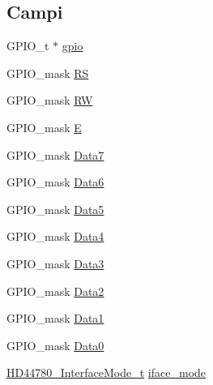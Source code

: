 \subsection*{Campi}
\begin{DoxyCompactItemize}
\item 
G\+P\+I\+O\+\_\+t $\ast$ \hyperlink{struct_h_d44780___l_c_d__t_acb3116190992a4d8d26545c103304d27}{gpio}
\item 
G\+P\+I\+O\+\_\+mask \hyperlink{struct_h_d44780___l_c_d__t_a142ae0db638dca7ab42e2183a1311d32}{R\+S}
\item 
G\+P\+I\+O\+\_\+mask \hyperlink{struct_h_d44780___l_c_d__t_af8225e4a125a2159215dfa03372c305f}{R\+W}
\item 
G\+P\+I\+O\+\_\+mask \hyperlink{struct_h_d44780___l_c_d__t_a851ed1cefdadae2e5069d1364ae8fc9e}{E}
\item 
G\+P\+I\+O\+\_\+mask \hyperlink{struct_h_d44780___l_c_d__t_a7f1bd9ea66e1fa6d0667c3f60d2f155d}{Data7}
\item 
G\+P\+I\+O\+\_\+mask \hyperlink{struct_h_d44780___l_c_d__t_a6a787746d32e0e18dbd57202e547756b}{Data6}
\item 
G\+P\+I\+O\+\_\+mask \hyperlink{struct_h_d44780___l_c_d__t_aff5ae7b6e5cd6f96a13e719cd07e3f15}{Data5}
\item 
G\+P\+I\+O\+\_\+mask \hyperlink{struct_h_d44780___l_c_d__t_a923c685eba8920c56f33117410da2742}{Data4}
\item 
G\+P\+I\+O\+\_\+mask \hyperlink{struct_h_d44780___l_c_d__t_ae6f2e7b5a4aa8b82451e021f2f5b3a89}{Data3}
\item 
G\+P\+I\+O\+\_\+mask \hyperlink{struct_h_d44780___l_c_d__t_afb22274224118a94688f1809cda55501}{Data2}
\item 
G\+P\+I\+O\+\_\+mask \hyperlink{struct_h_d44780___l_c_d__t_a9b310a22b76c920feb015a3a3084b125}{Data1}
\item 
G\+P\+I\+O\+\_\+mask \hyperlink{struct_h_d44780___l_c_d__t_aed1ef3393be1a14aa7b2644585e5bb08}{Data0}
\item 
\hyperlink{group___h_d44780_gaaaea8b73e24f7658da4118f6b01b45f0}{H\+D44780\+\_\+\+Interface\+Mode\+\_\+t} \hyperlink{struct_h_d44780___l_c_d__t_a7c5a51b8cc5de5ee2cf42b884bd1bc67}{iface\+\_\+mode}
\end{DoxyCompactItemize}


